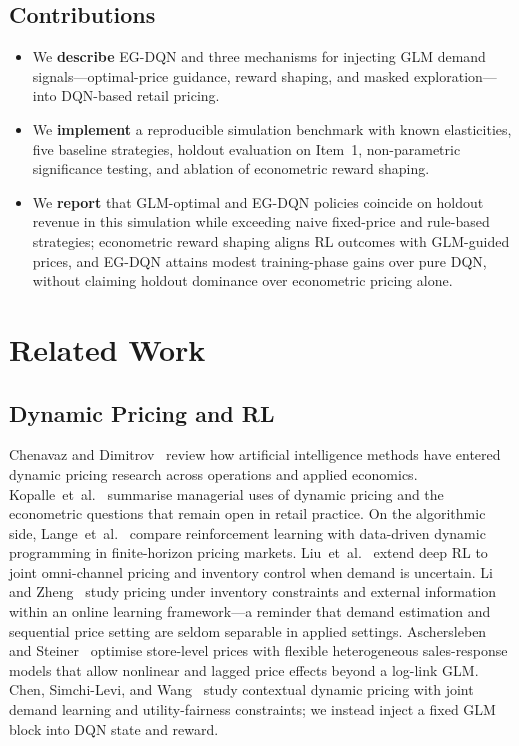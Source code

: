 \documentclass[journal, 10pt, twoside]{IEEEtran}
\begin{document}
\subsection*{Contributions}

\begin{itemize}
  \item We \textbf{describe} EG-DQN and three mechanisms for
    injecting GLM demand signals---optimal-price guidance, reward
    shaping, and masked exploration---into DQN-based retail pricing.
  \item We \textbf{implement} a reproducible simulation benchmark
    with known elasticities, five baseline strategies, holdout
    evaluation on Item~1, non-parametric significance testing, and
    ablation of econometric reward shaping.
  \item We \textbf{report} that GLM-optimal and EG-DQN policies
    coincide on holdout revenue in this simulation while exceeding
    naive fixed-price and rule-based strategies; econometric reward
    shaping aligns RL outcomes with GLM-guided prices, and EG-DQN
    attains modest training-phase gains over pure DQN, without
    claiming holdout dominance over econometric pricing alone.
\end{itemize}

\section{Related Work}
\label{sec:related}

\subsection{Dynamic Pricing and RL}

Chenavaz and Dimitrov~\cite{chenavaz2025} review how artificial
intelligence methods have entered dynamic pricing research across
operations and applied economics.
Kopalle~et~al.~\cite{kopalle2023} summarise managerial uses of dynamic
pricing and the econometric questions that remain open in retail
practice.
On the algorithmic side, Lange~et~al.~\cite{lange2025}
compare reinforcement learning with data-driven dynamic programming
in finite-horizon pricing markets.
Liu~et~al.~\cite{liu2024} extend deep RL to joint omni-channel pricing
and inventory control when demand is uncertain.
Li and Zheng~\cite{xiaocheng2023} study pricing under inventory
constraints and external information within an online learning
framework---a reminder that demand estimation and sequential price
setting are seldom separable in applied settings.
Aschersleben and Steiner~\cite{orspectrum2024} optimise store-level
prices with flexible heterogeneous sales-response models that allow
nonlinear and lagged price effects beyond a log-link GLM.
Chen, Simchi-Levi, and Wang~\cite{chenfair2023} study contextual
dynamic pricing with joint demand learning and utility-fairness
constraints; we instead inject a fixed GLM block into DQN state and
reward.
\end{document}
